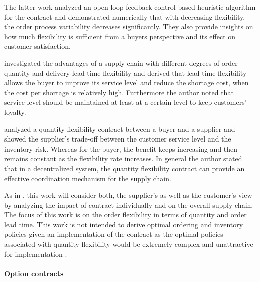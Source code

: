 \documentclass[12pt,english]{article}
\begin{document}
The latter work analyzed an open loop feedback control based heuristic
algorithm for the contract and demonstrated numerically that with
decreasing flexibility, the order process variability decreases significantly.
They also provide insights on how much flexibility is sufficient from
a buyers perspective and its effect on customer satisfaction.

\citet{Wang2008} investigated the advantages of a supply chain with
different degrees of order quantity and delivery lead time flexibility
and derived that lead time flexibility allows the buyer to improve
its service level and reduce the shortage cost, when the cost per
shortage is relatively high. Furthermore the author noted that service
level should be maintained at least at a certain level to keep customers\textquoteright{}
loyalty.

\citet{Kim2011} analyzed a quantity flexibility contract between
a buyer and a supplier and showed the supplier\textquoteright s trade-off
between the customer service level and the inventory risk. Whereas
for the buyer, the benefit keeps increasing and then remains constant
as the flexibility rate increases. In general the author stated that
in a decentralized system, the quantity flexibility contract can provide
an effective coordination mechanism for the supply chain.

As in \citet{Kim2011}, this work will consider both, the supplier\textquoteright s
as well as the customer\textquoteright s view by analyzing the impact
of contract individually and on the overall supply chain. The focus
of this work is on the order flexibility in terms of quantity and
order lead time. This work is not intended to derive optimal ordering
and inventory policies given an implementation of the contract as
the optimal policies associated with quantity flexibility would be
extremely complex and unattractive for implementation \citep{BassokAnupindi2008}.

\paragraph{Option contracts }
\end{document}
